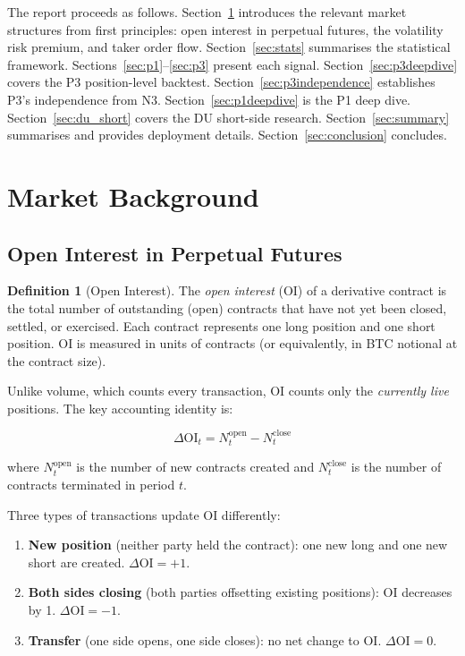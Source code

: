 \documentclass[12pt, a4paper]{article}
\theoremstyle{plain}
\theoremstyle{definition}
\newtheorem{definition}{Definition}[section]
\newcommand{\OI}{\mathrm{OI}}
\begin{document}
The report proceeds as follows. Section~\ref{sec:market} introduces
the relevant market structures from first principles: open interest in
perpetual futures, the volatility risk premium, and taker order flow.
Section~\ref{sec:stats} summarises the statistical framework.
Sections~\ref{sec:p1}--\ref{sec:p3} present each signal.
Section~\ref{sec:p3deepdive} covers the P3 position-level backtest.
Section~\ref{sec:p3independence} establishes P3's independence from N3.
Section~\ref{sec:p1deepdive} is the P1 deep dive.
Section~\ref{sec:du_short} covers the DU short-side research.
Section~\ref{sec:summary} summarises and provides deployment details.
Section~\ref{sec:conclusion} concludes.

\section{Market Background}
\label{sec:market}

\subsection{Open Interest in Perpetual Futures}
\label{sec:oi}

\begin{definition}[Open Interest]
  The \emph{open interest} (OI) of a derivative contract is the total
  number of outstanding (open) contracts that have not yet been closed,
  settled, or exercised.  Each contract represents one long position and
  one short position.  OI is measured in units of contracts (or equivalently,
  in BTC notional at the contract size).
\end{definition}

Unlike volume, which counts every transaction, OI counts only the
\emph{currently live} positions. The key accounting identity is:

\begin{equation}
  \Delta\OI_t = N_t^{\text{open}} - N_t^{\text{close}}
\end{equation}

where $N_t^{\text{open}}$ is the number of new contracts created and
$N_t^{\text{close}}$ is the number of contracts terminated in period $t$.

Three types of transactions update OI differently:
\begin{enumerate}
  \item \textbf{New position} (neither party held the contract): one new
        long and one new short are created. $\Delta\OI = +1$.
  \item \textbf{Both sides closing} (both parties offsetting existing
        positions): OI decreases by 1. $\Delta\OI = -1$.
  \item \textbf{Transfer} (one side opens, one side closes): no net change
        to OI. $\Delta\OI = 0$.
\end{enumerate}
\end{document}

